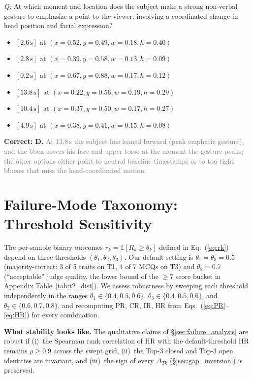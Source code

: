 \documentclass{article}
\begin{document}
\begin{examplebox}[title={(7) Temporal-Spatial Joint Localization}]
\emph{Q:} At which moment and location does the subject make a strong non-verbal gesture to emphasize a point to the viewer, involving a coordinated change in head position and facial expression?
\begin{itemize}[leftmargin=1.4em, itemsep=0pt, topsep=1pt, parsep=0pt]
\item[A.] $[2.6\,\text{s}]$ at $(x{=}0.52, y{=}0.49, w{=}0.18, h{=}0.40)$
\item[B.] $[2.8\,\text{s}]$ at $(x{=}0.39, y{=}0.58, w{=}0.13, h{=}0.09)$
\item[C.] $[0.2\,\text{s}]$ at $(x{=}0.67, y{=}0.88, w{=}0.17, h{=}0.12)$
\item[D.] $[13.8\,\text{s}]$ at $(x{=}0.22, y{=}0.56, w{=}0.19, h{=}0.29)$
\item[E.] $[10.4\,\text{s}]$ at $(x{=}0.37, y{=}0.50, w{=}0.17, h{=}0.27)$
\item[F.] $[4.9\,\text{s}]$ at $(x{=}0.38, y{=}0.41, w{=}0.15, h{=}0.08)$
\end{itemize}
\textcolor{humanc}{\textbf{Correct: D.}} \textcolor{gray}{ At $13.8$\,s the subject has leaned forward (peak emphatic gesture), and the bbox covers his face and upper torso at the moment the gesture peaks; the other options either point to neutral baseline timestamps or to too-tight bboxes that miss the head-coordinated motion.}
\end{examplebox}

\section{Failure-Mode Taxonomy: Threshold Sensitivity}
\label{app:threshold}

The per-sample binary outcomes $r_k=\mathbb{1}[R_k\!\geq\!\theta_k]$ defined in Eq.~(\ref{eq:rk}) depend on three thresholds $(\theta_1, \theta_2, \theta_3)$. Our default setting is $\theta_1\!=\!\theta_3\!=\!0.5$ (majority-correct: 3 of 5 traits on T1, 4 of 7 MCQs on T3) and $\theta_2\!=\!0.7$ (``acceptable'' judge quality, the lower bound of the $\geq\!7$ score bucket in Appendix Table~\ref{tab:t2_dist}). We assess robustness by sweeping each threshold independently in the ranges $\theta_1 \in \{0.4, 0.5, 0.6\}$, $\theta_3 \in \{0.4, 0.5, 0.6\}$, and $\theta_2 \in \{0.6, 0.7, 0.8\}$, and recomputing PR, CR, IR, HR from Eqs.~(\ref{eq:PR}--\ref{eq:HR}) for every combination.

\noindent\textbf{What stability looks like.} The qualitative claims of \S\ref{sec:failure_analysis} are robust if (i)~the Spearman rank correlation of HR with the default-threshold HR remains $\rho\!\geq\!0.9$ across the swept grid, (ii)~the Top-3 closed and Top-3 open identities are invariant, and (iii)~the sign of every $\Delta_{Tk}$ (\S\ref{sec:gap_inversion}) is preserved.
\end{document}
